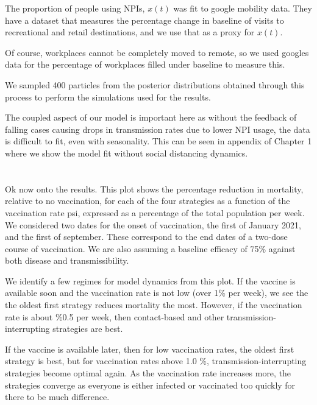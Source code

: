 \documentclass{article}
\begin{document}
The proportion of people using NPIs, $x(t)$ was fit to google mobility data. They have a dataset that measures the percentage change in baseline of visits to recreational and retail destinations, and we use that as a proxy for $x(t)$.

Of course, workplaces cannot be completely moved to remote, so we used googles data for the percentage of workplaces filled under baseline to measure this.

We sampled 400 particles from the posterior distributions obtained through this process to perform the simulations used for the results.  

The coupled aspect of our model is important here as without the feedback of falling cases causing drops in transmission rates due to lower NPI usage, the data is difficult to fit, even with seasonality. This can be seen in appendix of Chapter 1 where we show the model fit without social distancing dynamics. 

\section{}


Ok now onto the results. This plot shows the percentage reduction in mortality, relative to no vaccination, for each of the four strategies as a function of the vaccination rate psi, expressed as a percentage of the total population per week. We considered two dates for the onset of vaccination, the first of January 2021, and the first of september. These correspond to the end dates of a two-dose course of vaccination. We are also assuming a baseline efficacy of 75\% against both disease and transmissibility.

We identify a few regimes for model dynamics from this plot. If the vaccine is available soon and the vaccination rate is not low (over 1\% per week), we see the the oldest first strategy reduces mortality the most. However, if the vaccination rate is about \%0.5 per week, then contact-based and other transmission-interrupting strategies are best.

If the vaccine is available later, then for low vaccination rates, the oldest first strategy is best, but for vaccination rates above 1.0   \%, transmission-interrupting strategies become optimal again. As the vaccination rate increases more, the strategies converge as everyone is either infected or vaccinated too quickly for there to be much difference.

\end{document}
